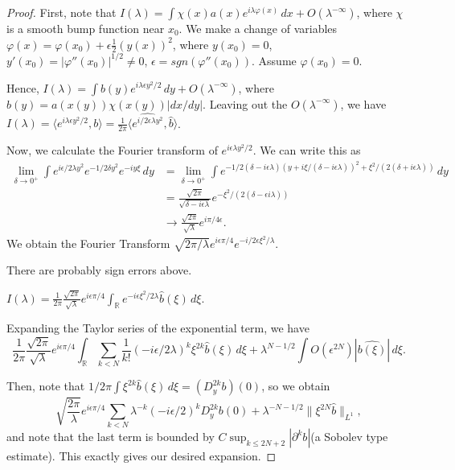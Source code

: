 \documentclass[12pt]{scrartcl}
\newcommand{\R}{\mathbb{R}}
\renewcommand{\hat}{\widehat}
\newcommand{\<}{\langle}
\renewcommand{\>}{\rangle}
\let \phi \varphi
\begin{document}
\begin{proof}
First, note that $I(\lambda) = \int \chi(x) a(x) e^{i \lambda \phi(x) }\,dx + O(\lambda^{-\infty})$, where $\chi$ is a smooth bump function near $x_0$.  We make a change of variables $\phi(x) = \phi(x_0) + \epsilon \frac{1}{2}(y(x))^2$, where $y(x_0) = 0$, $y'(x_0) = |\phi''(x_0)|^{1/2} \ne 0$, $\epsilon = sgn(\phi''(x_0))$.  Assume $\phi(x_0) = 0$.  


Hence, $I(\lambda) = \int b(y) e^{i \lambda \epsilon y^2/2}\,dy + O(\lambda^{-\infty})$, where $b(y) = a(x(y))\chi(x(y)) |dx/dy|$.  Leaving out the $O(\lambda^{-\infty})$, we have $I(\lambda) = \<e^{i \lambda \epsilon y^2/2}, b\> = \frac{1}{2\pi} \<\hat{e^{i/2 \epsilon \lambda y^2}}, \hat{b}\>$.

Now, we calculate the Fourier transform of $e^{i\epsilon \lambda y^2/2}$.  We can write this as 
\begin{align*}
\lim_{\delta \to 0^+} \int e^{i \epsilon/2 \lambda y^2} e^{-1/2 \delta y^2} e^{- i y \xi} \,dy &= \lim_{\delta \to 0^+} \int e^{-1/2(\delta - i \epsilon \lambda)(y + i\xi/(\delta - i \epsilon \lambda))^2 + \xi^2/(2(\delta + i \epsilon \lambda))}\,dy \\
&= \frac{\sqrt{2\pi}}{\sqrt{\delta - i \epsilon \lambda}} e^{-\xi^2/(2 (\delta - \epsilon i \lambda))} \\
&\to \frac{\sqrt{2\pi}}{\sqrt{\lambda}} e^{i \pi/4 \epsilon}.
\end{align*}
We obtain the Fourier Transform $\sqrt{2\pi / \lambda} e^{i \epsilon \pi/4} e^{-i/2 \epsilon \xi^2/\lambda}$.
\begin{remark} There are probably sign errors above.  
\end{remark}

$I(\lambda) = \frac{1}{2\pi} \frac{\sqrt{2\pi}}{\sqrt{\lambda}} e^{i \epsilon \pi / 4} \int_{\R} e^{-i\epsilon \xi^2/2\lambda} \hat{b}(\xi)\,d\xi.$

Expanding the Taylor series of the exponential term, we have
$$\frac{1}{2\pi} \frac{\sqrt{2\pi}}{\sqrt{\lambda}} e^{i \epsilon \pi / 4} \int_{\R} \sum_{k < N} \frac{1}{k!} (-i\epsilon/2\lambda)^k \xi^{2k} \hat{b}(\xi) \,d \xi + \lambda^{N - 1/2} \int O(\epsilon^{2N}) |\hat{b(\xi)}|\,d\xi.$$

Then, note that $1/2\pi \int \xi^{2k} \hat{b}(\xi)\,d\xi = (D_y^{2k} b)(0) $, so we obtain
$$\sqrt{\frac{2\pi}{\lambda}} e^{i \epsilon \pi/4} \sum_{k < N} \lambda^{-k} (-i\epsilon/2)^k D_y^{2k}b(0) + \lambda^{-N - 1/2} \|\xi^{2N}\hat{b}\|_{L^1},$$
and note that the last term is bounded by $C\sup_{k \le {2N + 2}} | \partial^k b|$(a Sobolev type estimate).  This exactly gives our desired expansion.
\end{proof}
\end{document}
